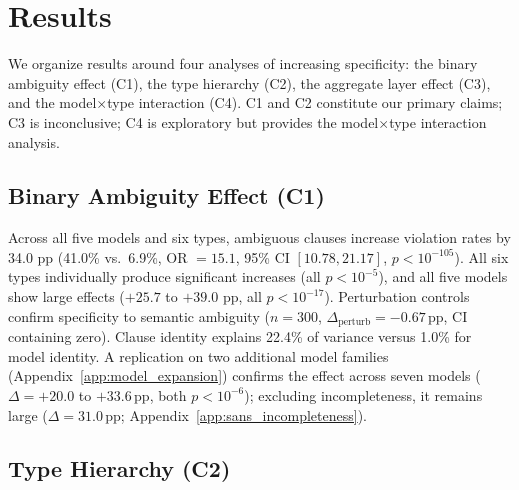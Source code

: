 \section{Results}
\label{sec:results}

We organize results around four analyses of increasing specificity: the binary ambiguity effect (C1), the type hierarchy (C2), the aggregate layer effect (C3), and the model$\times$type interaction (C4). C1 and C2 constitute our primary claims; C3 is inconclusive; C4 is exploratory but provides the model$\times$type interaction analysis.

\subsection{Binary Ambiguity Effect (C1)}

Across all five models and six types, ambiguous clauses increase violation rates by 34.0 pp (41.0\% vs.\ 6.9\%, OR $= 15.1$, 95\% CI $[10.78, 21.17]$, $p < 10^{-105}$). All six types individually produce significant increases (all $p < 10^{-5}$), and all five models show large effects ($+25.7$ to $+39.0$ pp, all $p < 10^{-17}$). Perturbation controls confirm specificity to semantic ambiguity ($n = 300$, $\Delta_{\text{perturb}} = -0.67$\,pp, CI containing zero). Clause identity explains 22.4\% of variance versus 1.0\% for model identity. A replication on two additional model families (Appendix~\ref{app:model_expansion}) confirms the effect across seven models ($\Delta = +20.0$ to $+33.6$\,pp, both $p < 10^{-6}$); excluding incompleteness, it remains large ($\Delta = 31.0$\,pp; Appendix~\ref{app:sans_incompleteness}).

\subsection{Type Hierarchy (C2)}


